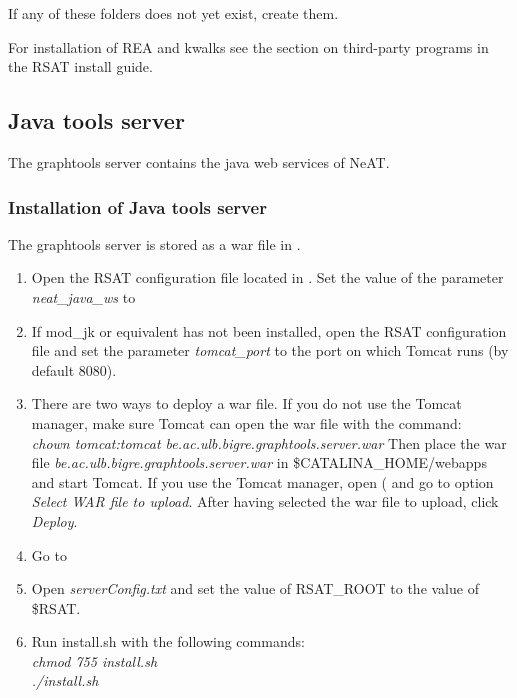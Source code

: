 \documentclass{book}
\begin{document}
If any of these folders does not yet exist, create them.

For installation of REA and kwalks see the section on third-party programs in
the RSAT install guide.

\subsection{Java tools server}

The graphtools server contains the java web services of NeAT.

\subsubsection{Installation of Java tools server}

The graphtools server is stored as a war file in .

\begin{enumerate}

\item Open the RSAT configuration file
 located in .
Set the value of the parameter \textit{neat\_java\_ws}
to 

\item If mod\_jk or equivalent has not been installed,
open the RSAT configuration file and set the parameter
\textit{tomcat\_port} to the port on which Tomcat runs (by default 8080).

\item There are two ways to deploy a war file.
 If you do not use the Tomcat manager, make sure
 Tomcat can open the war file with the command:\\
 \textit{chown tomcat:tomcat be.ac.ulb.bigre.graphtools.server.war}
 Then place the war file \textit{be.ac.ulb.bigre.graphtools.server.war} in
 \$CATALINA\_HOME/webapps and start Tomcat.
 If you use the Tomcat manager, open
 ( and go to option \textit{Select WAR file to upload}.
 After having selected the war file to upload, click \textit{Deploy}.

\item Go to 

\item Open \textit{serverConfig.txt} and set the value of RSAT\_ROOT to the value of \$RSAT.

\item Run install.sh with the following commands:\\
	  \textit{chmod 755 install.sh}\\
      \textit{./install.sh}

\end{enumerate}
\end{document}
